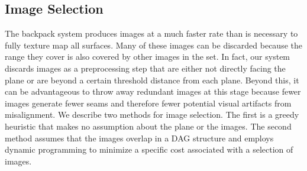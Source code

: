 \documentclass[runningheads]{llncs}
\begin{document}
%
%
%



\subsection{Image Selection}

The backpack system produces images at a much faster rate than is necessary to fully texture map all surfaces. Many of these images can be discarded because the range they cover is also covered by other images in the set. In fact, our system discards images as a preprocessing step that are either not directly facing the plane or are beyond a certain threshold distance from each plane. Beyond this, it can be advantageous to throw away redundant images at this stage because fewer images generate fewer seams and therefore fewer potential visual artifacts from misalignment. We describe two methods for image selection. The first is a greedy heuristic that makes no assumption about the plane or the images. The second method assumes that the images overlap in a DAG structure and employs dynamic programming to minimize a specific cost associated with a selection of images. 
\end{document}
